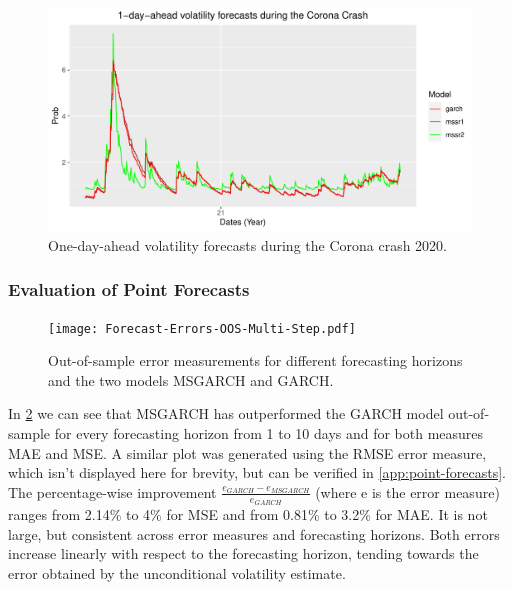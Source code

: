 \documentclass[11pt,a4paper]{article}
\begin{document}
\begin{figure}[H]
	\label{img:single-state-forecasts}
	\includegraphics[width=\linewidth]{CoronaCrash_MSGARCH_Decomposition.pdf}
	\caption{One-day-ahead volatility forecasts during the Corona crash 2020. }
\end{figure}

\subsubsection{Evaluation of Point Forecasts}

\begin{figure}[H]
	\centering
	\label{fig:oos-error-multi-step}
	\texttt{[image: Forecast-Errors-OOS-Multi-Step.pdf]}
	\caption{Out-of-sample error measurements for different forecasting horizons and the two models MSGARCH and GARCH.}
\end{figure}

In \cref{fig:oos-error-multi-step} we can see that MSGARCH has outperformed the GARCH model out-of-sample for every forecasting horizon from 1 to 10 days and for both measures MAE and MSE. 
A similar plot was generated using the RMSE error measure, which isn't displayed here for brevity, but can be verified in \cref{app:point-forecasts}. 
The percentage-wise improvement $\frac{e_{GARCH}-e_{MSGARCH}}{e_{GARCH}}$ (where e is the error measure) ranges from 2.14\% to 4\% for MSE and from 0.81\% to 3.2\% for MAE. It is not large, but consistent across error measures and forecasting horizons.
Both errors increase linearly with respect to the forecasting horizon, tending towards the error obtained by the unconditional volatility estimate.
\end{document}
